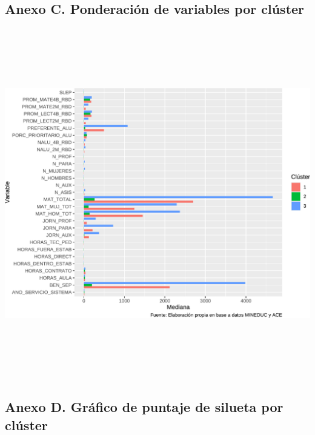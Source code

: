 \documentclass[
  12pt,
  letterpaper,
]{article}
\begin{document}
\subsection{Anexo C. Ponderación de variables por clúster}\label{anexo-c.-ponderaciuxf3n-de-variables-por-cluxfaster}

\includegraphics[width=0.8\linewidth,height=6in]{tesis_ver_final_files/figure-latex/anexo-c-1}

\newpage

\subsection{Anexo D. Gráfico de puntaje de silueta por clúster}\label{anexo-d.-gruxe1fico-de-puntaje-de-silueta-por-cluxfaster}
\end{document}
